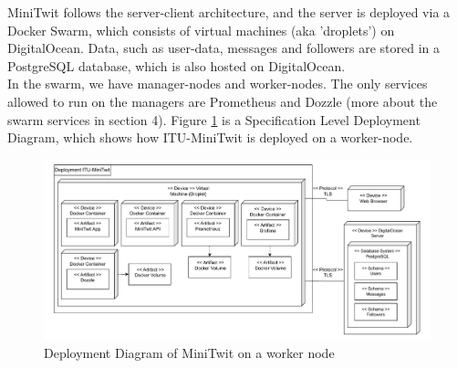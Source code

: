 MiniTwit follows the server-client architecture, and the server is deployed via a Docker Swarm, which consists of virtual machines (aka 'droplets') on DigitalOcean. Data, such as user-data, messages and followers are stored in a PostgreSQL database, which is also hosted on DigitalOcean. \\
In the swarm, we have manager-nodes and worker-nodes. The only services allowed to run on the managers are Prometheus and Dozzle (more about the swarm services in section 4). Figure \ref{fig:DeployDiagram} is a Specification Level Deployment Diagram, which shows how ITU-MiniTwit is deployed on a worker-node.
\begin{figure}[h]
\centering
\includegraphics[scale=0.8, center]{images/DeployUMLDraft(1).pdf}
\caption{Deployment Diagram of MiniTwit on a worker node}
\label{fig:DeployDiagram}
\end{figure}